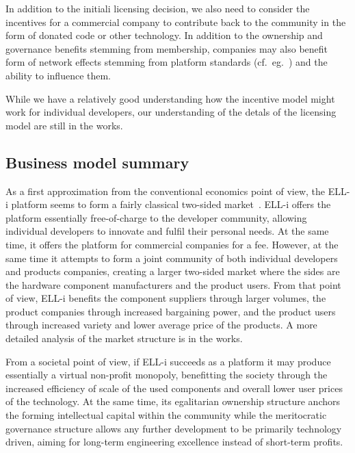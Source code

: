 \documentclass[draft,a4paper]{siamltex}
\begin{document}
In addition to the initiali licensing decision, we also need to
consider the incentives for a commercial company to contribute back to
the community in the form of donated code or other technology.
In addition to the ownership and governance benefits stemming from
membership, companies may also benefit form of network effects
stemming from platform standards
(cf.~eg.~\cite{gandal2002compatibility}) and the ability to influence
them.

While we have a relatively good understanding how the incentive model
might work for individual developers, our understanding of the detals
of the licensing model are still in the works.

\subsection{Business model summary}

As a first approximation from the conventional economics point of
view, the ELL-i platform seems to form a fairly classical two-sided
market~\cite{rochet2003platform}.  ELL-i offers the platform
essentially free-of-charge to the developer community, allowing
individual developers to innovate and fulfil their personal needs.  At
the same time, it offers the platform for commercial companies for a
fee.  However, at the same time it attempts to form a joint community
of both individual developers and products companies, creating a
larger two-sided market where the sides are the hardware component
manufacturers and the product users.  From that point of view, ELL-i
benefits the component suppliers through larger volumes, the product
companies through increased bargaining power, and the product users
through increased variety and lower average price of the products.  A
more detailed analysis of the market structure is in the works.

From a societal point of view, if ELL-i succeeds as a platform it may
produce essentially a virtual non-profit monopoly, benefitting the
society through the increased efficiency of scale of the used
components and overall lower user prices of the technology.  At the
same time, its egalitarian ownership structure anchors the forming
intellectual capital within the community while the meritocratic
governance structure allows any further development to be primarily
technology driven, aiming for long-term engineering excellence instead
of short-term profits.

\end{document}
